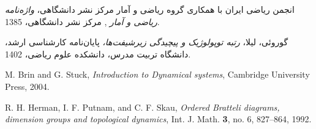 %
%
%
%
\small

\begin{thebibliography}{99}

انجمن ریاضی ایران با همکاری گروه ریاضی و آمار مرکز نشر دانشگاهی، 
\emph{%
واژه‌نامه ریاضی و آمار%
},
مرکز نشر دانشگاهی، 1385.


گوروئی، لیلا، 
\emph{
رتبه توپولوژیک و پیچیدگی زیرشیفت‌ها،
}
پایان‌نامه کارشناسی ارشد، دانشگاه تربیت مدرس، دانشکده علوم ریاضی، 1402.

\begin{LTRitems}
\resetlatinfont

M. Brin and G. Stuck, \emph{Introduction to Dynamical systems}, 
Cambridge University Press, 2004.

R. H. Herman, I. F. Putnam, and C. F. Skau, \emph{Ordered Bratteli diagrams, 
dimension groups and topological dynamics}, Int. J. Math. \textbf{3}, no. 6, 
827--864, 1992.

\end{LTRitems}



\end{thebibliography}